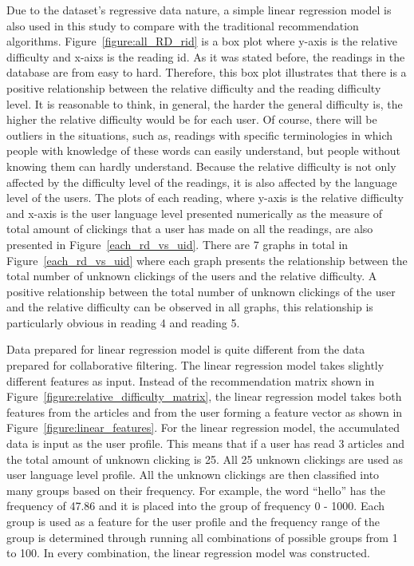 Due to the dataset's regressive data nature, a simple linear regression model is also used in this study to compare with the traditional recommendation algorithms. Figure~\ref{figure:all_RD_rid} is a box plot where y-axis is the relative difficulty and x-aixs is the reading id. As it was stated before, the readings in the database are from easy to hard. Therefore, this box plot illustrates that there is a positive relationship between the relative difficulty and the reading difficulty level. It is reasonable to think, in general, the harder the general difficulty is, the higher the relative difficulty would be for each user. Of course, there will be outliers in the situations, such as, readings with specific terminologies in which people with knowledge of these words can easily understand, but people without knowing them can hardly understand. Because the relative difficulty is not only affected by the difficulty level of the readings, it is also affected by the language level of the users. The plots of each reading, where y-axis is the relative difficulty and x-axis is the user language level presented numerically as the measure of total amount of clickings that a user has made on all the readings, are also presented in Figure~\ref{each_rd_vs_uid}. There are 7 graphs in total in Figure~\ref{each_rd_vs_uid} where each graph presents the relationship between the total number of unknown clickings of the users and the relative difficulty. A positive relationship between the total number of unknown clickings of the user and the relative difficulty can be observed in all graphs, this relationship is particularly obvious in reading 4 and reading 5.

Data prepared for linear regression model is quite different from the data prepared for collaborative filtering. The linear regression model takes slightly different features as input. Instead of the recommendation matrix shown in Figure~\ref{figure:relative_difficulty_matrix}, the linear regression model takes both features from the articles and from the user forming a feature vector as shown in Figure~\ref{figure:linear_features}. For the linear regression model, the accumulated data is input as the user profile. This means that if a user has read 3 articles and the total amount of unknown clicking is 25. All 25 unknown clickings are used as user language level profile. All the unknown clickings are then classified into many groups based on their frequency. For example, the word “hello” has the frequency of 47.86 and it is placed into the group of frequency 0 - 1000. Each group is used as a feature for the user profile and the frequency range of the group is determined through running all combinations of possible groups from 1 to 100. In every combination, the linear regression model was constructed. 


